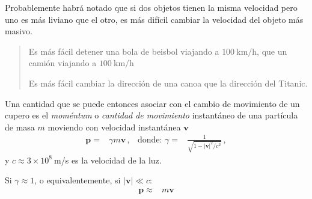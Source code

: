 Probablemente habrá notado que si dos objetos tienen la misma velocidad pero uno es más liviano que el otro, es más difícil cambiar la velocidad del objeto más masivo. 

\begin{frame}[plain]
  \begin{quote}
  Es más fácil detener una bola de beisbol viajando a $\SI{100}{\kilo\meter\per\hour}$, que un camión viajando a $\SI{100}{\kilo\meter\per\hour}$

Es más fácil cambiar la dirección de una canoa que la dirección del Titanic.
\end{quote}
\end{frame}

Una cantidad que se puede entonces asociar con el cambio de movimiento de un cupero es el \emph{moméntum} o \emph{cantidad de movimiento} instantáneo de una partícula de masa $m$ moviendo con velocidad instantánea $\mathbf{v}$
\begin{align}
  \mathbf{p}=&\gamma m \mathbf{v}\,, &\text{donde: } \gamma=&\frac{1}{\sqrt{1-{|\mathbf{v}|^2}/{c^2}}}\,,
\end{align}
y $c\approx 3\times 10^8\ $m/s es la velocidad de la luz.

Si $\gamma\approx1$, o equivalentemente, si $|\mathbf{v}|\ll c$:
\begin{align}
  \mathbf{p}\approx &m \mathbf{v}
\end{align}


\begin{extrapage}
  \newpage
  
  \qquad
  \newpage
\end{extrapage}


